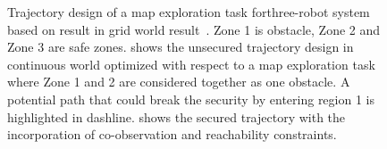 \documentclass[10pt,twocolumn,twoside]{IEEEtran}
\begin{document}
\begin{figure}
  \centering
  \caption{Trajectory design of a map exploration task forthree-robot system based on result in grid world result~. Zone 1 is obstacle, Zone 2 and Zone 3 are safe zones.  shows the unsecured trajectory design in continuous world optimized with respect to a map exploration task where Zone 1 and 2 are considered together as one obstacle.  A potential path that could break the security by entering region 1 is highlighted in dashline.  shows the secured trajectory with the incorporation of co-observation and reachability constraints.}
  \label{fig:example-application}
\end{figure}
\end{document}
